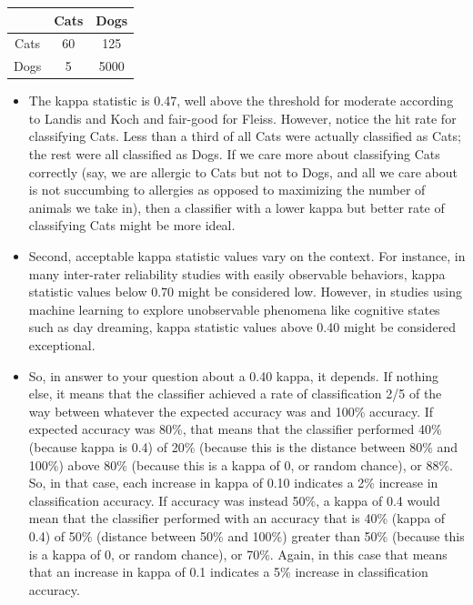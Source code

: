 \documentclass[caret-main.tex]{subfiles}
\begin{document}
\begin{center}
\begin{tabular}{|c|c|c|}
\hline 
    & Cats &Dogs \\ \hline
Cats& 60 & 125 \\ \hline
Dogs& 5 & 5000  \\ \hline
\end{tabular} 
\end{center} 
 
\newpage
\begin{itemize}
\item The kappa statistic is 0.47, well above the threshold for moderate according to Landis and Koch and fair-good for Fleiss. However, notice the hit rate for classifying Cats. Less than a third of all Cats were actually classified as Cats; the rest were all classified as Dogs. If we care more about classifying Cats correctly (say, we are allergic to Cats but not to Dogs, and all we care about is not succumbing to allergies as opposed to maximizing the number of animals we take in), then a classifier with a lower kappa but better rate of classifying Cats might be more ideal.

\item Second, acceptable kappa statistic values vary on the context. For instance, in many inter-rater reliability studies with easily observable behaviors, kappa statistic values below 0.70 might be considered low. However, in studies using machine learning to explore unobservable phenomena like cognitive states such as day dreaming, kappa statistic values above 0.40 might be considered exceptional.

\item So, in answer to your question about a 0.40 kappa, it depends. If nothing else, it means that the classifier achieved a rate of classification 2/5 of the way between whatever the expected accuracy was and 100\% accuracy. If expected accuracy was 80\%, that means that the classifier performed 40\% (because kappa is 0.4) of 20\% (because this is the distance between 80\% and 100\%) above 80\% (because this is a kappa of 0, or random chance), or 88\%. So, in that case, each increase in kappa of 0.10 indicates a 2\% increase in classification accuracy. If accuracy was instead 50\%, a kappa of 0.4 would mean that the classifier performed with an accuracy that is 40\% (kappa of 0.4) of 50\% (distance between 50\% and 100\%) greater than 50\% (because this is a kappa of 0, or random chance), or 70\%. Again, in this case that means that an increase in kappa of 0.1 indicates a 5\% increase in classification accuracy.


\end{itemize}
\end{document}
